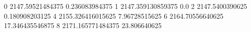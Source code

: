 0 2147.59521484375 0.236083984375
1 2147.359130859375 0.0
2 2147.5400390625 0.180908203125
4 2155.326416015625 7.96728515625
6 2164.70556640625 17.346435546875
8 2171.165771484375 23.806640625
